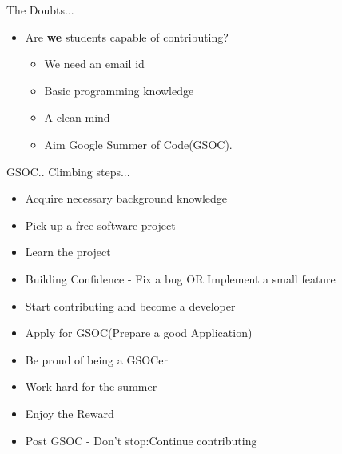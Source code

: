 \documentclass[14pt]{beamer}
\begin{document}
\begin{frame}{The Doubts...}
\begin{itemize}
\item Are {\textbf {we}} students capable of contributing?
  \begin{itemize}
\pause
    \item We need an email id
    \item Basic programming knowledge
    \item A clean mind
\pause
    \item Aim Google Summer of Code(GSOC).
  \end{itemize}
\end{itemize}
\end{frame}

\begin{frame}{GSOC.. Climbing steps...}
\begin{itemize}
\item Acquire necessary background knowledge
\pause
\item Pick up a free software project
\pause
\item Learn the project
\pause
\item Building Confidence - Fix a bug OR Implement a small feature
\pause
\item Start contributing and become a developer
\pause
\item Apply for GSOC(Prepare a good Application)
\pause
\item Be proud of being a GSOCer
\pause
\item Work hard for the summer
\pause
\item Enjoy the Reward
\pause
\item Post GSOC - Don't stop:Continue contributing
\pause
\end{itemize}
\end{frame}
\end{document}
